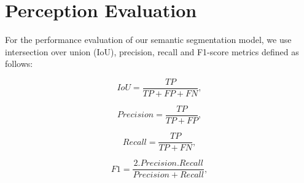 \begin{table}[h]
\caption{Traffic sign classification dataset.}
\label{table:classification-dataset}
\end{table}

\section{Perception Evaluation}
For the performance evaluation of our semantic segmentation model, we use
intersection over union (IoU), precision, recall and F1-score metrics defined
as follows:

\begin{equation}
    IoU = \frac{TP}{TP + FP + FN},
\label{eq:iou}
\end{equation}


\begin{equation}
    Precision = \frac{TP}{TP + FP},
\label{eq:precision}
\end{equation}


\begin{equation}
    Recall = \frac{TP}{TP + FN},
\label{eq:recall}
\end{equation}

\begin{equation}
    F1 = \frac{2.Precision.Recall}{Precision + Recall},
\label{eq:F1}
\end{equation}

